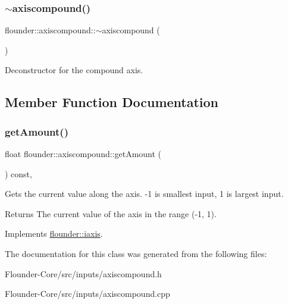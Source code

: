 \subsubsection{\texorpdfstring{$\sim$axiscompound()}{~axiscompound()}}
{\footnotesize\ttfamily flounder\+::axiscompound\+::$\sim$axiscompound (\begin{DoxyParamCaption}{ }\end{DoxyParamCaption})}



Deconstructor for the compound axis. 



\subsection{Member Function Documentation}
\mbox{\label{classflounder_1_1axiscompound_aad0f38f1a532c269cd0e803953861400}} 
\subsubsection{\texorpdfstring{get\+Amount()}{getAmount()}}
{\footnotesize\ttfamily float flounder\+::axiscompound\+::get\+Amount (\begin{DoxyParamCaption}{ }\end{DoxyParamCaption}) const\hspace{0.3cm}{\ttfamily [override]}, {\ttfamily [virtual]}}



Gets the current value along the axis. -\/1 is smallest input, 1 is largest input. 

\begin{DoxyReturn}{Returns}
The current value of the axis in the range (-\/1, 1). 
\end{DoxyReturn}


Implements \hyperlink{classflounder_1_1iaxis_a990ecb5ffa5ec07b3d5e2e4016b2e4a0}{flounder\+::iaxis}.



The documentation for this class was generated from the following files\+:\begin{DoxyCompactItemize}
\item 
Flounder-\/\+Core/src/inputs/axiscompound.\+h\item 
Flounder-\/\+Core/src/inputs/axiscompound.\+cpp\end{DoxyCompactItemize}
